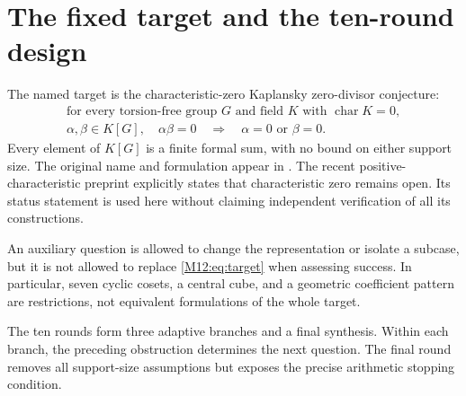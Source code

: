 \documentclass[11pt,a4paper,oneside]{report}
\theoremstyle{definition}
\theoremstyle{remark}
\begin{document}
\section{The fixed target and the ten-round design}

The named target is the characteristic-zero Kaplansky zero-divisor
conjecture:
\begin{equation}\label{M12:eq:target}
\begin{gathered}
 \text{for every torsion-free group }G\text{ and field }K
 \text{ with }\operatorname{char}K=0,\\
 \alpha,\beta\in K[G],\quad \alpha\beta=0
 \quad\Longrightarrow\quad \alpha=0\text{ or }\beta=0.
\end{gathered}
\end{equation}
Every element of $K[G]$ is a finite formal sum, with no bound on
either support size. The original name and formulation appear in
\cite{B:ATsmall}. The recent positive-characteristic preprint \cite{B:Ivanov}
explicitly states that characteristic zero remains open. Its status
statement is used here without claiming independent verification of
all its constructions.

An auxiliary question is allowed to change the representation or
isolate a subcase, but it is not allowed to replace
\eqref{M12:eq:target} when assessing success. In particular, seven
cyclic cosets, a central cube, and a geometric coefficient pattern
are restrictions, not equivalent formulations of the whole target.

The ten rounds form three adaptive branches and a final synthesis.
Within each branch, the preceding obstruction determines the next
question. The final round removes all support-size assumptions but
exposes the precise arithmetic stopping condition.
\end{document}
